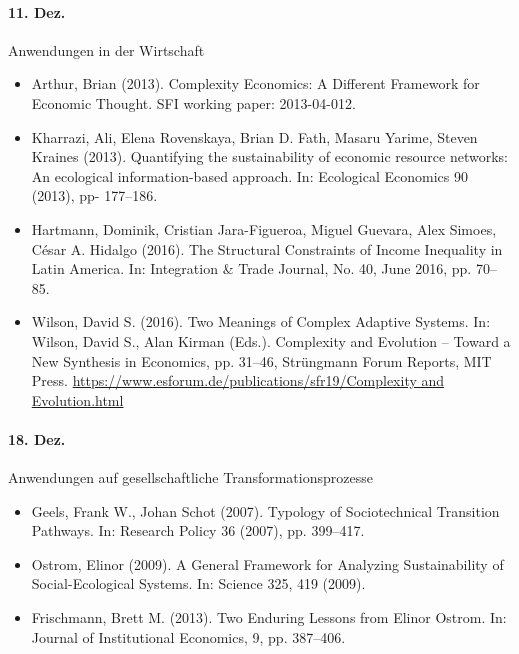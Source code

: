 \documentclass[11pt,a4paper]{article}
\begin{document}
\paragraph{11. Dez.}
Anwendungen in der Wirtschaft
\begin{itemize}
\item Arthur, Brian (2013). Complexity Economics: A Different Framework for
  Economic Thought. SFI working paper: 2013-04-012. 
\item Kharrazi, Ali, Elena Rovenskaya, Brian D. Fath, Masaru Yarime, Steven
  Kraines (2013). Quantifying the sustainability of economic resource
  networks: An ecological information-based approach. In: Ecological Economics
  90 (2013), pp- 177–186.
\item Hartmann, Dominik, Cristian Jara-Figueroa, Miguel Guevara, Alex Simoes,
  César A. Hidalgo (2016). The Structural Constraints of Income Inequality in
  Latin America. In: Integration \& Trade Journal, No. 40, June 2016,
  pp. 70--85. 
\item Wilson, David S. (2016). Two Meanings of Complex Adaptive Systems. In:
  Wilson, David S., Alan Kirman (Eds.).  Complexity and Evolution -- Toward a
  New Synthesis in Economics, pp. 31–46, Strüngmann Forum Reports, MIT Press.
  \url{https://www.esforum.de/publications/sfr19/Complexity and Evolution.html}
\end{itemize}
  
\paragraph{18. Dez.}
Anwendungen auf gesellschaftliche Transformationsprozesse
\begin{itemize}
\item Geels, Frank W., Johan Schot (2007). Typology of Sociotechnical
  Transition Pathways. In: Research Policy 36 (2007), pp. 399–417.
\item Ostrom, Elinor (2009). A General Framework for Analyzing Sustainability
  of Social-Ecological Systems. In: Science 325, 419 (2009). 
\item Frischmann, Brett M. (2013). Two Enduring Lessons from Elinor Ostrom. In:
  Journal of Institutional Economics, 9, pp. 387--406.
\end{itemize}
\end{document}
